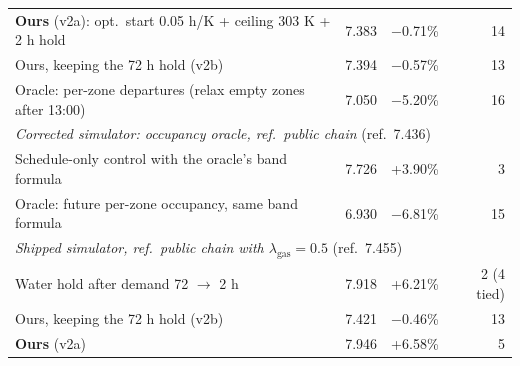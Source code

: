 \begin{tabular}{lrrr}
\rowcolor[HTML]{EDF3FC}\textbf{Ours} (v2a): opt.\ start 0.05 h/K + ceiling 303 K + 2 h hold & 7.383 & $-$0.71\% & 14 \\
\rowcolor[HTML]{EDF3FC}Ours, keeping the 72 h hold (v2b) & 7.394 & $-$0.57\% & 13 \\
Oracle: per-zone departures (relax empty zones after 13:00) & 7.050 & $-$5.20\% & 16 \\
\midrule
\multicolumn{4}{l}{\emph{Corrected simulator: occupancy oracle, ref.\ public chain} (ref.\ 7.436)} \\
Schedule-only control with the oracle's band formula & 7.726 & +3.90\% & 3 \\
Oracle: future per-zone occupancy, same band formula & 6.930 & $-$6.81\% & 15 \\
\midrule
\multicolumn{4}{l}{\emph{Shipped simulator, ref.\ public chain with $\lambda_{\mathrm{gas}}=0.5$} (ref.\ 7.455)} \\
Water hold after demand 72 $\to$ 2 h & 7.918 & +6.21\% & 2 (4 tied) \\
\rowcolor[HTML]{EDF3FC}Ours, keeping the 72 h hold (v2b) & 7.421 & $-$0.46\% & 13 \\
\rowcolor[HTML]{EDF3FC}\textbf{Ours} (v2a) & 7.946 & +6.58\% & 5 \\
\bottomrule
\end{tabular}